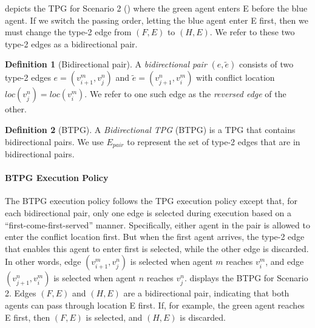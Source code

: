 \documentclass[letterpaper]{article} %
\theoremstyle{definition}
\newtheorem{definition}{Definition}
\newcommand{\rishi}[1]{\textcolor{black}{\textbf{Rishi:}} 
\textcolor{purple}{#1}}
\begin{document}
 depicts the TPG for Scenario 2 () where the green agent enters E before the blue agent. If we switch the passing order, letting the blue agent enter E first, then we must change the type-2 edge from $(F, E)$ to $(H, E)$. We refer to these two type-2 edges as a bidirectional pair.
\begin{definition}[Bidirectional pair]
\label{def: bType2}
A \emph{bidirectional pair} $(e, \tilde{e})$ consists of two type-2 edges $e = (v_{i+1}^m, v_{j}^n)$ and $\tilde{e} = (v_{j+1}^n, v_{i}^m)$ with conflict location $loc(v_{j}^n) = loc(v_{i}^m)$. We refer to one such edge as the \emph{reversed edge} of the other. %
\end{definition}
\begin{definition}[BTPG]
\label{def:BTPG}
    A \emph{Bidirectional TPG} (BTPG) is a TPG that contains bidirectional pairs. We use $E_{pair}$ to represent the set of type-2 edges that are in bidirectional pairs.
\end{definition}

\paragraph{BTPG Execution Policy}
The BTPG execution policy follows the TPG execution policy except that, for each bidirectional pair, only one edge is selected during execution based on a ``first-come-first-served'' manner. Specifically, either agent in the pair is allowed to enter the conflict location first. But when the first agent arrives, the type-2 edge that enables this agent to enter first is selected, while the other edge is discarded. In other words, edge $(v_{i+1}^m, v_j^n)$ is selected when agent $m$ reaches $v_i^m$, and edge $(v_{j+1}^n, v_{i}^m)$ is selected when agent $n$ reaches $v_j^n$.
 displays the BTPG for Scenario 2.
Edges $(F,E)$ and $(H,E)$ are a bidirectional pair, indicating that both agents can pass through location E first. If, for example, the green agent reaches E first, then $(F,E)$ is selected, and $(H,E)$ is discarded.
\end{document}
